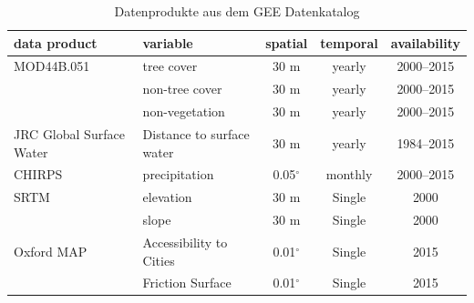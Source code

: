 \documentclass[12pt,twoside,a4paper,final]{report}
\begin{document}
\begin{table}[h]
\begin{tabularx}{\textwidth}{llccc}
\hline
\textbf{data product} & \textbf{variable} & \textbf{spatial} & \textbf{temporal} & \textbf{availability}\\
\hline

MOD44B.051 & tree cover  & 30 m & yearly & 2000–2015 \\

 & non-tree cover  & 30 m & yearly & 2000–2015 \\

 & non-vegetation  & 30 m & yearly & 2000–2015 \\

JRC Global Surface Water  & Distance to surface water & 30 m & yearly & 1984–2015 \\

CHIRPS & precipitation & 0.05$^\circ$ & monthly & 2000–2015\\

SRTM & elevation  & 30 m & Single & 2000\\
 & slope  & 30 m & Single & 2000\\

Oxford MAP & Accessibility to Cities  & 0.01$^\circ$ & Single & 2015\\

& Friction Surface  & 0.01$^\circ$  & Single & 2015\\

\hline
\end{tabularx}
\caption{Datenprodukte aus dem GEE Datenkatalog}
\end{table}
\end{document}
